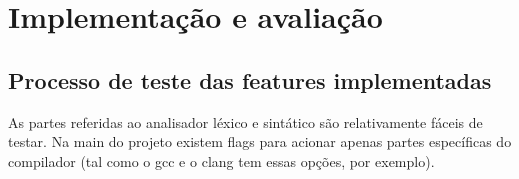 %
%
% 
%

\chapter{Implementação e avaliação}
\noindent

\section{Processo de teste das features implementadas}

As partes referidas ao analisador léxico e sintático são relativamente fáceis de testar. Na main do projeto existem flags para acionar apenas partes específicas do compilador (tal como o gcc e o clang tem essas opções, por exemplo).

